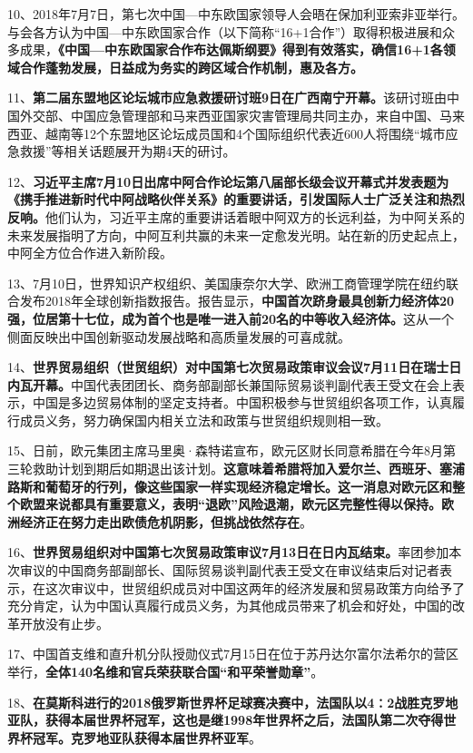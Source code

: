 10、2018年7月7日，第七次中国---中东欧国家领导人会晤在保加利亚索非亚举行。与会各方认为中国---中东欧国家合作（以下简称``16+1合作''）取得积极进展和众多成果，{\textbf{《中国---中东欧国家合作布达佩斯纲要》得到有效落实，确信16+1各领域合作蓬勃发展，日益成为务实的跨区域合作机制，惠及各方。}}

11、{\textbf{第二届东盟地区论坛城市应急救援研讨班9日在广西南宁开幕。}}该研讨班由中国外交部、中国应急管理部和马来西亚国家灾害管理局共同主办，来自中国、马来西亚、越南等12个东盟地区论坛成员国和4个国际组织代表近600人将围绕``城市应急救援''等相关话题展开为期4天的研讨。

12、{\textbf{习近平主席7月10日出席中阿合作论坛第八届部长级会议开幕式并发表题为《携手推进新时代中阿战略伙伴关系》的重要讲话，引发国际人士广泛关注和热烈反响。}}他们认为，习近平主席的重要讲话着眼中阿双方的长远利益，为中阿关系的未来发展指明了方向，中阿互利共赢的未来一定愈发光明。站在新的历史起点上，中阿全方位合作进入新阶段。

13、7月10日，世界知识产权组织、美国康奈尔大学、欧洲工商管理学院在纽约联合发布2018年全球创新指数报告。报告显示，{\textbf{中国首次跻身最具创新力经济体20强，位居第十七位，成为首个也是唯一进入前20名的中等收入经济体。}}这从一个侧面反映出中国创新驱动发展战略和高质量发展的可喜成就。

14、{\textbf{世界贸易组织（世贸组织）对中国第七次贸易政策审议会议7月11日在瑞士日内瓦开幕。}}中国代表团团长、商务部副部长兼国际贸易谈判副代表王受文在会上表示，中国是多边贸易体制的坚定支持者。中国积极参与世贸组织各项工作，认真履行成员义务，努力确保国内相关立法和政策与世贸组织规则相一致。

15、日前，欧元集团主席马里奥·森特诺宣布，欧元区财长同意希腊在今年8月第三轮救助计划到期后如期退出该计划。{\textbf{这意味着希腊将加入爱尔兰、西班牙、塞浦路斯和葡萄牙的行列，像这些国家一样实现经济稳定增长。这一消息对欧元区和整个欧盟来说都具有重要意义，表明``退欧''风险退潮，欧元区完整性得以保持。欧洲经济正在努力走出欧债危机阴影，但挑战依然存在}}。

16、{\textbf{世界贸易组织对中国第七次贸易政策审议7月13日在日内瓦结束。}}率团参加本次审议的中国商务部副部长、国际贸易谈判副代表王受文在审议结束后对记者表示，在这次审议中，世贸组织成员对中国这两年的经济发展和贸易政策方向给予了充分肯定，认为中国认真履行成员义务，为其他成员带来了机会和好处，中国的改革开放没有止步。

17、中国首支维和直升机分队授勋仪式7月15日在位于苏丹达尔富尔法希尔的营区举行，{\textbf{全体140名维和官兵荣获联合国``和平荣誉勋章''}}。

18、{\textbf{在莫斯科进行的2018俄罗斯世界杯足球赛决赛中，法国队以4∶2战胜克罗地亚队，获得本届世界杯冠军，这也是继1998年世界杯之后，法国队第二次夺得世界杯冠军。克罗地亚队获得本届世界杯亚军}}。

